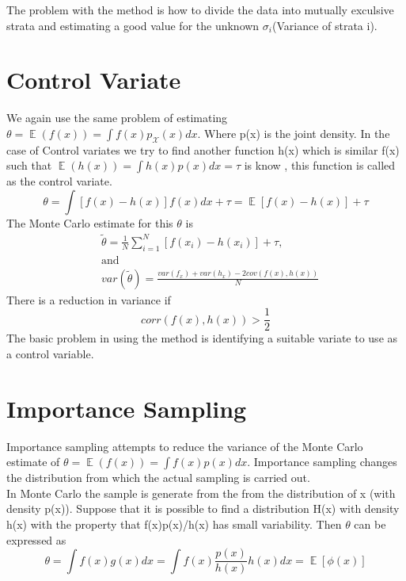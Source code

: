 \documentclass[a4paper,twoside]{iiththesis}
\theoremstyle{definition}
\theoremstyle{definition}
\theoremstyle{remark}
\DeclareMathOperator*{\E}{\mathop{\mathbb{E}}}
\begin{document}
The problem with the method is how to divide the data into mutually exculsive strata and estimating a good value for the unknown $\sigma_i$(Variance of strata i).

\section{Control Variate}

We again use the same problem of estimating $\theta = \E(f(x)) = \int f(x) p_{\mathcal{X}} (x) dx$. Where p(x) is the joint density. In the case of Control variates we try to find another function h(x) which is similar f(x) such that $\E(h(x)) = \int h(x) p(x) dx = \tau $ is know , this function is called as the control variate. 
\begin{equation}
	\theta = \int [f(x) - h(x)] f(x) dx + \tau = \E[f(x) - h(x)] + \tau
\end{equation}
The Monte Carlo estimate for this $\theta$ is 
\begin{align}
&\widetilde{\theta} = \frac{1}{N} \sum_{i=1}^N [f(x_i) - h(x_i)] + \tau,  \\
& \text{and} \\
& var(\tilde{\theta}) = \frac{var(f_x) + var(h_x) - 2 cov(f(x), h(x))}{N}
\end{align}
There is a reduction in variance if 
\begin{equation}
corr(f(x), h(x)) > \frac{1}{2}
\end{equation}
The basic problem in using the method is identifying a suitable variate to use as a control variable.

\section{Importance Sampling }
Importance sampling attempts to reduce the variance of the Monte Carlo estimate of $\theta = \E (f(x)) = \int f(x) p(x) dx $. Importance sampling changes the distribution from which the actual sampling is carried out.\\ In Monte Carlo the sample is generate from the from the distribution of x (with density p(x)). Suppose that it is possible to find a distribution H(x) with density h(x) with the property that f(x)p(x)/h(x) has small variability. Then $\theta$ can be expressed as
\begin{equation}\label{Imporatnce Sampling}
\theta =\int f(x)g(x)dx =\int  f(x) \frac{p(x)} {h(x)} h(x)dx = \E [\phi(x)]
\end{equation}
\end{document}
